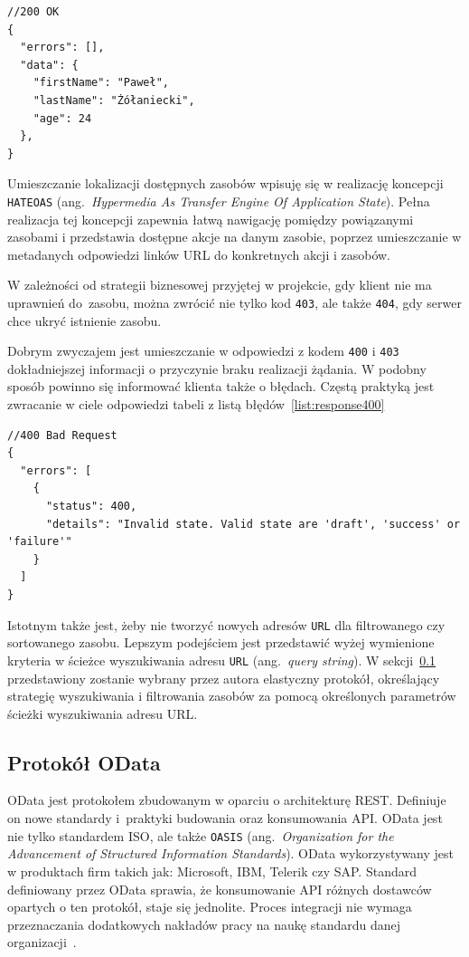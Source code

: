 {\belowcaptionskip=-10pt
\begin{lstlisting}[label=list:response200,
    caption=Przykład pomyślnej odpowiedzi serwera]
//200 OK
{
  "errors": [],
  "data": {
    "firstName": "Paweł",
    "lastName": "Żółaniecki",
    "age": 24
  },
}
\end{lstlisting}
}

Umieszczanie lokalizacji dostępnych zasobów wpisuję się w realizację koncepcji \texttt{HATEOAS} (ang.~\emph{Hypermedia As Transfer Engine Of Application State}). Pełna realizacja tej koncepcji zapewnia łatwą nawigację pomiędzy powiązanymi zasobami i przedstawia dostępne akcje na danym zasobie, poprzez umieszczanie w metadanych odpowiedzi linków URL do konkretnych akcji i zasobów.

W zależności od strategii biznesowej przyjętej w projekcie, gdy klient nie ma uprawnień do~zasobu, można zwrócić nie tylko kod \texttt{403}, ale także \texttt{404}, gdy serwer chce ukryć istnienie zasobu.

Dobrym zwyczajem jest umieszczanie w odpowiedzi z kodem \texttt{400} i \texttt{403} dokładniejszej informacji o przyczynie braku realizacji żądania. W podobny sposób powinno się informować klienta także o błędach. Częstą praktyką jest zwracanie w ciele odpowiedzi tabeli z listą błędów~\ref{list:response400}

{\belowcaptionskip=-10pt
\begin{lstlisting}[label=list:response400,
    caption=Odpowiedź serwera zawierająca opis błędu]
//400 Bad Request
{
  "errors": [
    {
      "status": 400,
      "details": "Invalid state. Valid state are 'draft', 'success' or 'failure'"
    }
  ]
}
\end{lstlisting}
}

Istotnym także jest, żeby nie tworzyć nowych adresów \texttt{URL} dla filtrowanego czy sortowanego zasobu. Lepszym podejściem jest przedstawić wyżej wymienione kryteria w ścieżce wyszukiwania adresu \texttt{URL} (ang.~\emph{query string}). W sekcji~\ref{subsec:odata} przedstawiony zostanie wybrany przez autora elastyczny protokół, określający strategię wyszukiwania i filtrowania zasobów za pomocą określonych parametrów ścieżki wyszukiwania adresu URL.

\subsection{Protokół OData}
\label{subsec:odata}

OData jest protokołem zbudowanym w oparciu o architekturę REST. Definiuje on nowe standardy i~praktyki budowania oraz konsumowania API. OData jest nie tylko standardem ISO, ale także \texttt{OASIS} (ang.~\emph{Organization for the Advancement of Structured Information Standards}). OData wykorzystywany jest w produktach firm takich jak: Microsoft, IBM, Telerik czy SAP. Standard definiowany przez OData sprawia, że konsumowanie API różnych dostawców opartych o ten protokół, staje się jednolite. Proces integracji nie wymaga przeznaczania dodatkowych nakładów pracy na naukę standardu danej organizacji~\cite{odata-why-use}.

